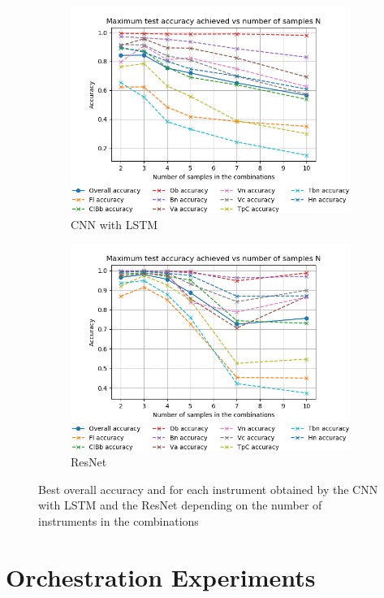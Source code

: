 \documentclass[runningheads,a4paper]{llncs}
\begin{document}
\begin{figure}
\centering
\begin{subfigure}{.65\textwidth}
  \centering
  \includegraphics[width=0.9\linewidth]{../latex/figs/Acc_vs_N_CNN.png}
  \caption{CNN with LSTM}
  \label{best_acc_cnn}
\end{subfigure}%
\begin{subfigure}{.65\textwidth}
  \centering
  \includegraphics[width=0.9\linewidth]{../latex/figs/Acc_vs_N_ResNet.png}
  \caption{ResNet}
  \label{best_acc_resnet}
\end{subfigure}
\caption{Best overall accuracy and for each instrument obtained by the CNN with LSTM and the ResNet depending on the number of instruments in the combinations}
\end{figure}


\section{Orchestration Experiments}
\label{sec:orchestration}
\end{document}
